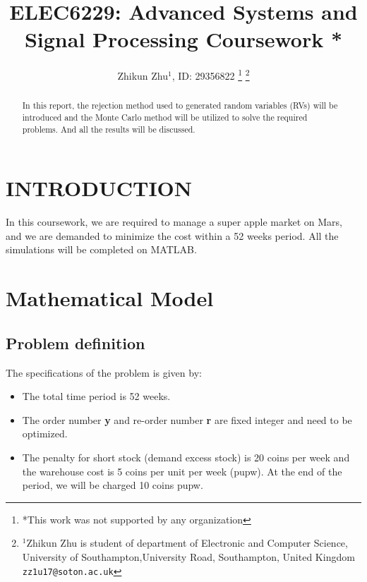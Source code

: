 \documentclass[letterpaper, 10 pt, conference]{ieeeconf}
\title{\LARGE \bf
ELEC6229: Advanced Systems and Signal Processing Coursework \uppercase\expandafter{\romannumeral2}*
}
\author{Zhikun Zhu$^{1}$, ID: 29356822%
  \thanks{*This work was not supported by any organization}%
  \thanks{$^{1}$Zhikun Zhu is student of department of Electronic and Computer Science,
          University of Southampton,University Road, Southampton, United Kingdom
          {\tt\small zz1u17@soton.ac.uk}}}
\begin{document}
\maketitle
\thispagestyle{empty}
\pagestyle{empty}


\begin{abstract}

In this report, the rejection method used to generated random variables (RVs) will be introduced and the Monte Carlo method will be utilized to solve the required problems. And all the results will be discussed.

\end{abstract}


\section{INTRODUCTION}

In this coursework, we are required to manage a super apple market on Mars, and we are demanded to minimize the cost within a 52 weeks period. All the simulations will be completed on MATLAB.


\section{Mathematical Model}
\subsection{Problem definition}

The specifications of the problem is given by:
\begin{itemize}
  \item The total time period is 52 weeks.
  \item The order number \textbf{y} and re-order number \textbf{r} are fixed integer and need to be optimized.
  \item The penalty for short stock (demand excess stock) is 20 coins per week and the warehouse cost is 5 coins per unit per week (pupw). At the end of the period, we will be charged 10 coins pupw.
\end{itemize}
\end{document}

